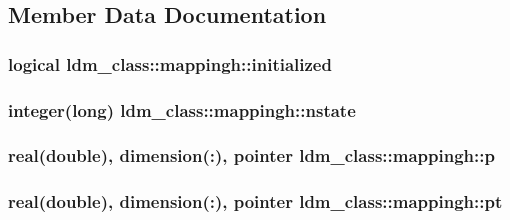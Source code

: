 \subsection{Member Data Documentation}
\hypertarget{structldm__class_1_1mappingh_af1c4c38811def9952afe0d9b22e217d1}{
\subsubsection[{initialized}]{\setlength{\rightskip}{0pt plus 5cm}logical ldm\+\_\+class\+::mappingh\+::initialized\hspace{0.3cm}{\ttfamily [private]}}}\label{structldm__class_1_1mappingh_af1c4c38811def9952afe0d9b22e217d1}
\hypertarget{structldm__class_1_1mappingh_afcacabc5c5c78955a82149ec73e61ace}{
\subsubsection[{nstate}]{\setlength{\rightskip}{0pt plus 5cm}integer(long) ldm\+\_\+class\+::mappingh\+::nstate\hspace{0.3cm}{\ttfamily [private]}}}\label{structldm__class_1_1mappingh_afcacabc5c5c78955a82149ec73e61ace}
\hypertarget{structldm__class_1_1mappingh_a4e04fac91c6ad36dcc151cd32fdcb5d6}{
\subsubsection[{p}]{\setlength{\rightskip}{0pt plus 5cm}real(double), dimension(\+:), pointer ldm\+\_\+class\+::mappingh\+::p\hspace{0.3cm}{\ttfamily [private]}}}\label{structldm__class_1_1mappingh_a4e04fac91c6ad36dcc151cd32fdcb5d6}
\hypertarget{structldm__class_1_1mappingh_a32e0570b54823fee3707253fd3f841d4}{
\subsubsection[{pt}]{\setlength{\rightskip}{0pt plus 5cm}real(double), dimension(\+:), pointer ldm\+\_\+class\+::mappingh\+::pt\hspace{0.3cm}{\ttfamily [private]}}}\label{structldm__class_1_1mappingh_a32e0570b54823fee3707253fd3f841d4}
